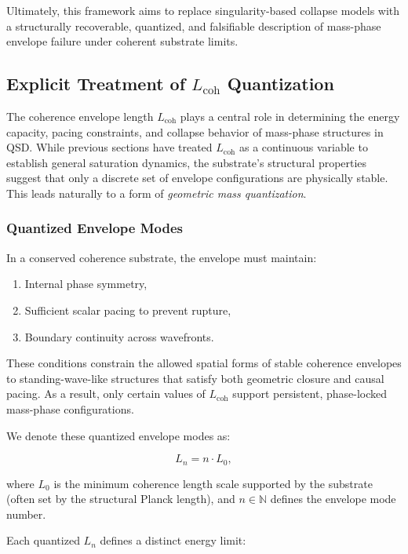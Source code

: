 \documentclass[entropy,article,submit,pdftex,moreauthors]{Definitions/mdpi}
\begin{document}
Ultimately, this framework aims to replace singularity-based collapse models with a structurally recoverable, quantized, and falsifiable description of mass-phase envelope failure under coherent substrate limits.
\subsection{Explicit Treatment of \texorpdfstring{$L_{\text{coh}}$}{Lcoh} Quantization}

The coherence envelope length $L_{\text{coh}}$ plays a central role in determining the energy capacity, pacing constraints, and collapse behavior of mass-phase structures in QSD. While previous sections have treated $L_{\text{coh}}$ as a continuous variable to establish general saturation dynamics, the substrate’s structural properties suggest that only a discrete set of envelope configurations are physically stable. This leads naturally to a form of \textit{geometric mass quantization}.

\subsubsection{Quantized Envelope Modes}

In a conserved coherence substrate, the envelope must maintain:
\begin{enumerate}
  \item Internal phase symmetry,
  \item Sufficient scalar pacing to prevent rupture,
  \item Boundary continuity across wavefronts.
\end{enumerate}

These conditions constrain the allowed spatial forms of stable coherence envelopes to standing-wave-like structures that satisfy both geometric closure and causal pacing. As a result, only certain values of $L_{\text{coh}}$ support persistent, phase-locked mass-phase configurations.

We denote these quantized envelope modes as:

\begin{equation}
L_n = n \cdot L_0,
\end{equation}

where $L_0$ is the minimum coherence length scale supported by the substrate (often set by the structural Planck length), and $n \in \mathbb{N}$ defines the envelope mode number.

Each quantized $L_n$ defines a distinct energy limit:
\end{document}
